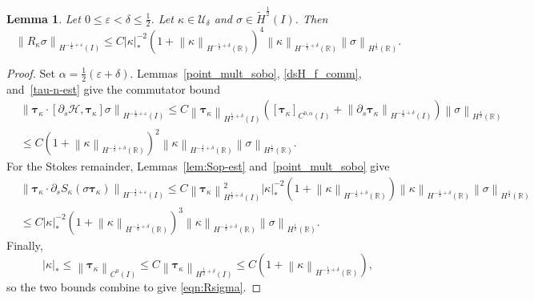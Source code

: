 \documentclass[11pt,reqno]{amsart}
\theoremstyle{plain}
\newtheorem{lemma}[theorem]{Lemma}
\theoremstyle{definition}
\numberwithin{equation}{section}
\newcommand{\paren}[1]{\left(#1\right)}
\newcommand{\p}{\partial}
\newcommand{\mc}[1]{\mathcal{#1}}
\newcommand{\wt}[1]{\widetilde{#1}}
\newcommand{\bm}[1]{\boldsymbol{#1}}
\newcommand{\abs}[1]{\left\lvert #1 \right\rvert}
\newcommand{\norm}[1]{\left\lVert #1 \right\rVert}
\newcommand{\R}{\mathbb{R}}
\newcommand{\tk}{\bm\tau_\kappa}
\newcommand{\xk}{\bm X_\kappa}
\newcommand{\ci}[1]{C^{#1}(I)}
\newcommand{\hi}[1]{H^{#1}(I)}
\newcommand{\thi}[1]{\wt H^{#1}(I)}
\newcommand{\hr}[1]{H^{#1}(\R)}
\begin{document}
\begin{lemma}\label{R-est}
Let $0\le \varepsilon < \delta \le \frac{1}{2}$.
Let $\kappa\in\mc U_\delta$ and $\sigma\in \thi{\frac{1}{2}}$. Then
\begin{equation}\label{eqn:Rsigma}
\norm{R_\kappa \sigma}_{\hi{-\frac{1}{2}+\varepsilon}} \le C\abs{\kappa}_*^{-2} \paren{1+\norm{\kappa}_{\hr{-\frac{1}{2}+\delta}}}^4\norm{\kappa}_{\hr{-\frac{1}{2}+\delta}}\norm{\sigma}_{\hr{\frac{1}{2}}}.
\end{equation}
\end{lemma}
\begin{proof}
Set $\alpha=\frac{1}{2}\paren{\varepsilon+\delta}$.
Lemmas~\ref{point_mult_sobo}, \ref{dsH_f_comm},
and~\ref{tau-n-est} give the commutator bound
\begin{equation}
\begin{aligned}
    &\norm{\tk\cdot[\p_s\mc H, \tk]\sigma}_{\hi{-\frac{1}{2}+\varepsilon}} \le C\norm{\tk}_{\hi{\frac{1}{2}+\delta}} \paren{[\tk]_{\ci{0,\alpha}}+\norm{\p_s\tk}_{\hi{-\frac{1}{2}+\delta}}} \norm{\sigma}_{\hr{\frac{1}{2}}}\\
    & \le C\paren{1+\norm{\kappa}_{\hr{-\frac{1}{2}+\delta}}}^2 \norm{\kappa}_{\hr{-\frac{1}{2}+\delta}} \norm{\sigma}_{\hr{\frac{1}{2}}}.
\end{aligned}
\end{equation}
For the Stokes remainder, Lemmas~\ref{lem:Sop-est}
and~\ref{point_mult_sobo} give
\begin{equation}
\begin{aligned}
    &\norm{\tk\cdot\p_s S_\kappa(\sigma\tk)}_{\hi{-\frac{1}{2}+\varepsilon}}
    \le C \norm{\tk}_{\hi{\frac{1}{2}+\delta}}^2 \abs{\kappa}_*^{-2}\paren{1+\norm{\kappa}_{\hr{-\frac{1}{2}+\delta}}}\norm{\kappa}_{\hr{-\frac{1}{2}+\delta}} \norm{\sigma}_{\hr{\frac{1}{2}}} \\
    &\le C\abs{\kappa}_*^{-2} \paren{1+\norm{\kappa}_{\hr{-\frac{1}{2}+\delta}}}^3\norm{\kappa}_{\hr{-\frac{1}{2}+\delta}}\norm{\sigma}_{\hr{\frac{1}{2}}}.
\end{aligned}
\end{equation}
Finally,
\begin{equation}
    \abs{\kappa}_*
    \le \norm{\tk}_{\ci{0}}
    \le C\norm{\tk}_{\hi{\frac{1}{2}+\delta}}
    \le C\paren{1+\norm{\kappa}_{\hr{-\frac{1}{2}+\delta}}},
\end{equation}
so the two bounds combine to give \eqref{eqn:Rsigma}.
\end{proof}
\end{document}
